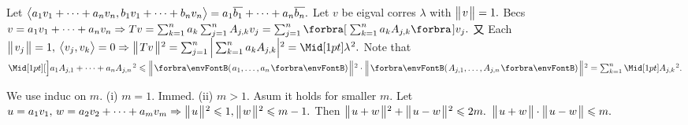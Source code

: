 Let $\big\langle{}a_1v_1+\dots+a_nv_n,b_1v_1+\dots+b_nv_n{}\big\rangle=a_1\overline{b_1}+\dots+a_n\overline{b_n}.$ Let $v$ be eigval corres $\lambda$ with $\big\Vert\hspace{1pt}{}v{}\hspace{1pt}\big\Vert=1.$\vspace{1pt}\parSol{}
Becs $v=a_1v_1+\dots+a_nv_n\Rightarrow Tv=\sum_{k=1}^na_k\sum_{j=1}^nA_{j,k}v_j=\sum_{j=1}^n\BigSbra{\sum_{k=1}^na_kA_{j,k}}v_j.$\vspace{3pt}\parSol{}
又 Each $\Dvert{v_j}=1,\:\Ang{v_j,v_k}=0\Rightarrow\Dvertsq{Tv}=\sum_{j=1}^n\Big|\sum_{k=1}^na_kA_{j,k}\Big|{^2}=\aMidsq{\lambda}.$\vspace{3pt}\parSol{}
Note that $\aXMidsq{a_1A_{j,1}+\dots+a_nA_{j,n}}\leqslant\BigDvertsq{\Par{a_1,\dots,a_n}}\cdot\BigDvertsq{\Par{A_{j,1},\dots,A_{j,n}}}=\sum_{k=1}^n\aMidsq{A_{j,k}}.$\PfEnd
\SepLine

We use induc on $m.$ (i) $m=1.$ Immed. (ii) $m>1.$ Asum it holds for smaller $m.$\parSol{}
Let $u=a_1v_1,\,w=a_2v_2+\dots+a_mv_m\Rightarrow\big\Vert\hspace{1pt}{}u{}\hspace{1pt}\big\Vert{\hspace{0.5pt}}{^2}\leqslant1,\big\Vert\hspace{1pt}{}w{}\hspace{1pt}\big\Vert{\hspace{0.5pt}}{^2}\leqslant{m-1}.$\parSol{}
Then $\big\Vert\hspace{1pt}{}u+w{}\hspace{1pt}\big\Vert{\hspace{0.5pt}}{^2}+\big\Vert\hspace{1pt}{}u-w{}\hspace{1pt}\big\Vert{\hspace{0.5pt}}{^2}\leqslant2m.$ \;\;\Or $\big\Vert\hspace{1pt}{}u+w{}\hspace{1pt}\big\Vert\cdot\big\Vert\hspace{1pt}{}u-w{}\hspace{1pt}\big\Vert\leqslant m.$\PfEnd
\SepLine

\ChEnd\pagebreak


\vspace{4pt}

\SepLine


